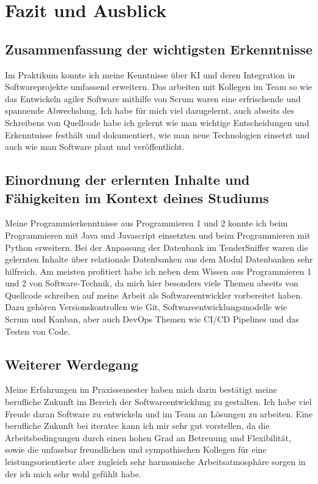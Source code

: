 \chapter{Fazit und Ausblick}


\section{Zusammenfassung der wichtigsten Erkenntnisse}
Im Praktikum konnte ich meine Kenntnisse über KI und deren Integration in Softwareprojekte umfassend erweitern. Das
arbeiten mit Kollegen im Team so wie das Entwickeln agiler Software mithilfe von Scrum waren eine erfrischende und
spannende Abwechslung. Ich habe für mich viel dazugelernt, auch abseits des Schreibens von Quellcode habe ich gelernt
wie man wichtige Entscheidungen und Erkenntnisse festhält und dokumentiert, wie man neue Technologien einsetzt und auch
wie man Software plant und veröffentlicht.


\section{Einordnung der erlernten Inhalte und Fähigkeiten im Kontext deines Studiums}
Meine Programmierkenntnisse aus Programmieren 1 und 2 konnte ich beim Programmieren mit Java und Javascript einsetzten und beim
Programmieren mit Python erweitern. Bei der Anpassung der Datenbank im TenderSniffer waren die gelernten Inhalte über
relationale Datenbanken aus dem Modul Datenbanken sehr hilfreich. Am meisten profitiert habe ich neben dem Wissen aus
Programmieren 1 und 2 von Software-Technik, da mich hier besonders viele Themen abseits von Quellcode schreiben auf
meine Arbeit als Softwareentwickler vorbereitet haben. Dazu gehören Versionskontrollen wie Git, Softwareentwicklungsmodelle wie Scrum und
Kanban, aber auch DevOps Themen wie CI/CD Pipelines und das Testen von Code.


\section{Weiterer Werdegang}
Meine Erfahrungen im Praxissemester haben mich darin bestätigt meine berufliche Zukunft im Bereich der
Softwareentwicklung zu gestalten. Ich habe viel Freude daran Software zu entwickeln und im Team an Lösungen zu arbeiten. 
Eine berufliche Zukunft bei iteratec kann ich mir sehr gut vorstellen, da die Arbeitsbedingungen durch einen hohen Grad
an Betreuung und Flexibilität, sowie die unfassbar freundlichen und sympathischen Kollegen für eine leistungsorientierte
aber zugleich sehr harmonische Arbeitsatmosphäre sorgen in der ich mich sehr wohl gefühlt habe.